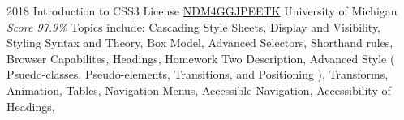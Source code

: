 \documentclass[11pt,a4paper]{moderncv}
\begin{document}
\cventry
    {2018}
    {Introduction to CSS3}
    {License
        \href{https://www.coursera.org/account/accomplishments/records/NDM4GGJPEETK}
        {NDM4GGJPEETK}
    }
    {University of Michigan}
    {\textit{Score 97.9\%}}
    {
        Topics include:                                                          %
            Cascading Style Sheets,                                                          %
            Display and Visibility,                                                          %
            Styling Syntax and Theory,                                                          %
            Box Model,                                                          %
            Advanced Selectors,                                                          %
            Shorthand rules,                                                          %
            Browser Capabilites,                                                          %
            Headings,                                                          %
            Homework Two Description,                                                          %
            Advanced Style (                                                          %
                Psuedo-classes,                                                          %
                Pseudo-elements,                                                          %
                Transitions,                                                          %
                and Positioning                                                          %
            ),                                                          %
            Transforms,                                                          %
            Animation,                                                          %
            Tables,                                                          %
            Navigation Menus,                                                          %
            Accessible Navigation,                                                          %
            Accessibility of Headings,                                                          %
    }
\end{document}

